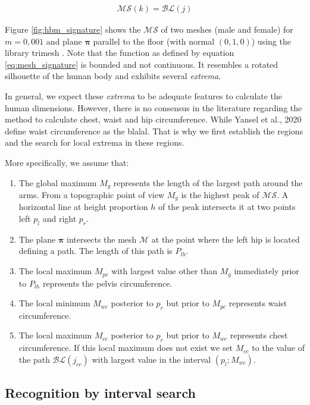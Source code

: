 \documentclass[runningheads, orivec]{llncs}
\begin{document}
\begin{align}\label{eq:mesh_signature}
\mathcal{MS}(k) = \mathcal{BL}(j)
\end{align}

Figure \ref{fig:hbm_signature} shows the $\mathcal{MS}$ of two meshes (male 
and female) for 
$m=0,001$ and plane $\boldsymbol{\pi}$ parallel to the floor (with normal $(0, 
1,0)$) using the library trimesh \cite{trimesh}. Note that the function as 
defined by equation \ref{eq:mesh_signature} is bounded and not continuous. It 
resembles a rotated silhouette of the human body and exhibits several 
\textit{extrema}.

In general, we expect these \textit{extrema} to be adequate features to 
calculate the human dimensions. However, there is no consensus in the 
literature regarding the method to calculate chest, waist and hip 
circumference. While Yansel et al., 2020 define waist circumference as the 
blalal. That is why we first establish the regions and the search for local 
extrema in these regions.

More specifically, we assume that:
\begin{enumerate}
	\item The global maximum $M_g$ represents the length of the largest path 
	around the arms. From a topographic point of view $M_g$ is the highest peak 
	of $\mathcal{MS}$. A horizontal line at height proportion $h$ of the peak 
	intersects 
	it at two points left $p_l$ and right $p_r$.
	\item The plane $\boldsymbol{\pi}$ intersects the mesh $\mathcal{M}$ at the 
	point where the left hip is located defining a path. The length of this 
	path is $P_{lh}$.	
	\item The local maximum $M_{pc}$ with largest value other than $M_g$ 
	immediately prior to $P_{lh}$ represents the pelvis circumference.	
	\item The local minimum $M_{wc}$ posterior to $p_r$ but prior to $M_{pc}$ 
	represents waist circumference.
	\item The local maximum $M_{cc}$ posterior to $p_r$ but prior to $M_{wc}$ 
	represents 
	chest circumference. If this local maximum does not exist we set $M_{cc}$ 
	to the value of the path $\mathcal{BL}(j_{cc})$ with largest value in the 
	interval $(p_l; M_{wc})$.
\end{enumerate}

\subsection{Recognition by interval search}\label{subsec:interval_search}
\end{document}
